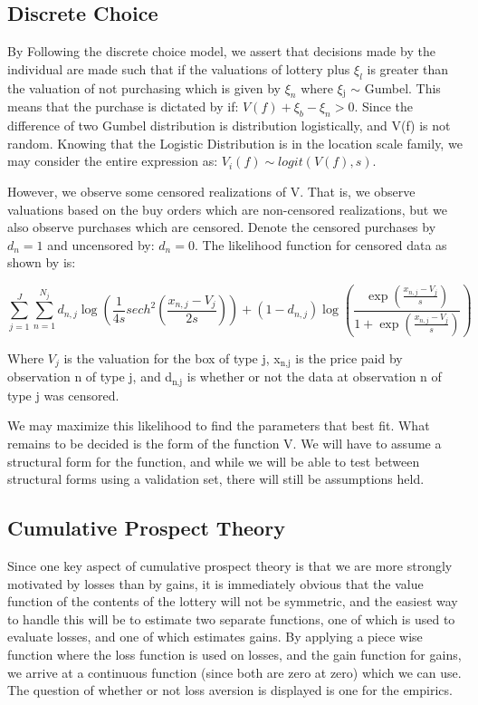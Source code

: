 \documentclass[11pt]{article}
\begin{document}
\subsection{Discrete Choice}
\label{sec-2-2}
By Following the discrete choice model, we assert that decisions made
by the individual are made such that if the valuations of lottery plus
$\xi_l$ is greater than the valuation of not purchasing which is given by
$\xi_n$ where $\xi$$_{\text{j}}$ $\sim$ Gumbel. This means that the purchase is dictated
by if: $V(f) + \xi_b - \xi_n > 0$. Since the difference of two Gumbel
distribution is distribution logistically, and V(f) is not
random. Knowing that the Logistic Distribution is in the location
scale family, we may consider the entire expression as: $V_i(f) \sim logit( V(f), s )$.

However, we observe some censored realizations of V. That is, we
observe valuations based on the buy orders which are non-censored
realizations, but we also observe purchases which are censored. Denote
the censored purchases by $d_n = 1$ and uncensored by: $d_n = 0$. The
likelihood function for censored data as shown by \cite{LimeBoy} is:

$$\sum_{j=1}^J \sum_{n=1}^{N_j} d_{n,j} \log( \frac{1}{4s} sech^2 ( \frac{x_{n,j} - V_j}{2s} ) ) + (1-d_{n,j}) \log ( \frac{\exp(\frac{x_{n,j} - V_j}{s})}{1+\exp(\frac{x_{n,j} - V_j}{s})} )$$

Where $V_j$ is the valuation for the box of type j, x$_{\text{n,j}}$ is the price
paid by observation n of type j, and d$_{\text{n,j}}$ is whether or not the data
at observation n of type j was censored.

We may maximize this likelihood to find the parameters that best
fit. What remains to be decided is the form of the function V. We will
have to assume a structural form for the function, and while we will
be able to test between structural forms using a validation set, there
will still be assumptions held.

\subsection{Cumulative Prospect Theory}
\label{sec-2-3}
Since one key aspect of cumulative prospect theory is that we are more
strongly motivated by losses than by gains, it is immediately obvious
that the value function of the contents of the lottery will not be
symmetric, and the easiest way to handle this will be to estimate two
separate functions, one of which is used to evaluate losses, and one
of which estimates gains. By applying a piece wise function where the
loss function is used on losses, and the gain function for gains, we
arrive at a continuous function (since both are zero at zero) which we
can use. The question of whether or not loss aversion is displayed is
one for the empirics.
\end{document}
